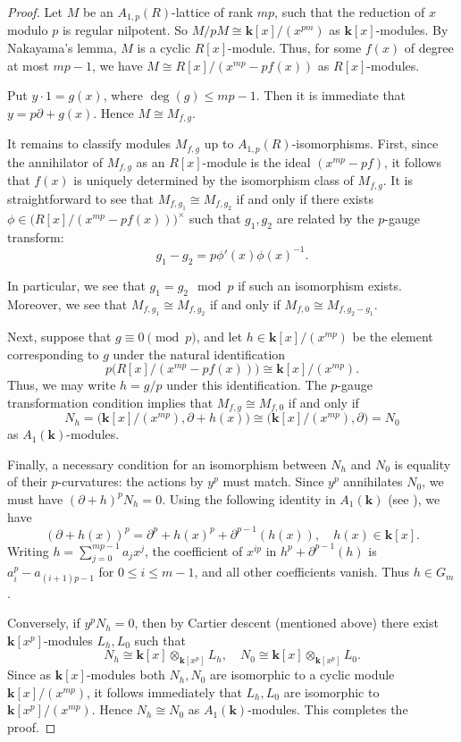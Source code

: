 \documentclass[12pt,letterpaper]{amsart}
\theoremstyle{plain}
\theoremstyle{definition}
\begin{document}
\begin{proof}
    
Let $M$ be an $A_{1,p}(R)$-lattice of rank $mp$, such that the reduction of $x$ modulo $p$ is regular nilpotent. So $M/pM\cong\mathbf{k}[x]/(x^{pm})$ as $\mathbf{k}[x]$-modules. By Nakayama's lemma, $M$ is a cyclic $R[x]$-module. Thus, for some $f(x)$ of degree at most $mp-1$, we have $M\cong R[x]/(x^{mp}-pf(x))$ as $R[x]$-modules. 

Put $y\cdot 1=g(x)$,  where $\deg(g)\leq mp-1$.  Then it is immediate that $y=p\partial+g(x)$.  Hence $M\cong M_{f,g}$.

It remains to classify modules $M_{f, g}$ up to $A_{1,p}(R)$-isomorphisms. First, since the annihilator of $M_{f,g}$  
as an $R[x]$-module
is the ideal $(x^{mp}-pf)$, it follows that $f(x)$  is uniquely determined by the isomorphism class of $M_{f,g}$. 
It is straightforward to see that $M_{f,g_1}\cong M_{f,g_2}$  if and only if there exists $\phi\in\big(R[x]/(x^{mp}-pf(x))\big)^\times$ 
such that $g_1, g_2$ are related by the $p$-gauge transform:
$$g_1-g_2=p\phi'(x)\phi(x)^{-1}.$$

In particular, we see that $g_1=g_2 \mod p$ if such an isomorphism exists. Moreover, we see that $M_{f,g_1}\cong M_{f,g_2}$
if and only if $M_{f, 0}\cong M_{f, g_2-g_1}$. 

Next, suppose that $g\equiv 0\pmod p$, and let
$h\in\mathbf{k}[x]/(x^{mp})$ be the element corresponding to $g$ under
the natural identification
\[
p\big(R[x]/(x^{mp}-pf(x))\big)\cong\mathbf{k}[x]/(x^{mp}).
\]
Thus, we may write $h=g/p$ under this identification. The $p$-gauge
transformation condition implies that $M_{f,g}\cong M_{f,0}$ if and only if
\[
N_h=\big(\mathbf{k}[x]/(x^{mp}),\partial+h(x)\big)
\cong\big(\mathbf{k}[x]/(x^{mp}),\partial\big)=N_0
\]
as $A_1(\mathbf{k})$-modules.

Finally, a necessary condition for an isomorphism between $N_h$ and $N_0$
is equality of their $p$-curvatures: the actions by $y^p$ must match.
Since $y^p$ annihilates $N_0$, we must have $(\partial+h)^pN_h=0$.
Using the following identity in $A_1(\mathbf{k})$ (see \cite[Theorem~1.3]{B}), we have
$$(\partial+h(x))^p=\partial^p+h(x)^p+\partial^{p-1}(h(x)),\quad h(x)\in\mathbf{k}[x].$$
Writing $h=\sum_{j=0}^{mp-1}a_jx^j$, the coefficient of $x^{ip}$ in
$h^p+\partial^{p-1}(h)$ is $a_i^p-a_{(i+1)p-1}$ for
$0\le i\le m-1$, and all other coefficients vanish. Thus $h\in G_m$.

Conversely, if $y^pN_h=0$, then by Cartier descent (mentioned above)
there exist $\mathbf{k}[x^p]$-modules $L_h,L_0$ such that
$$N_h\cong \mathbf{k}[x]\otimes_{\mathbf{k}[x^p]}L_h,\quad
N_0\cong \mathbf{k}[x]\otimes_{\mathbf{k}[x^p]}L_0.$$
Since as $\mathbf{k}[x]$-modules both $N_h,N_0$ are isomorphic to a cyclic
module $\mathbf{k}[x]/(x^{mp})$, it follows immediately that
$L_h,L_0$ are isomorphic to $\mathbf{k}[x^p]/(x^{mp})$.
Hence $N_h\cong N_0$ as $A_1(\mathbf{k})$-modules. This completes the proof.


\end{proof}
\end{document}
